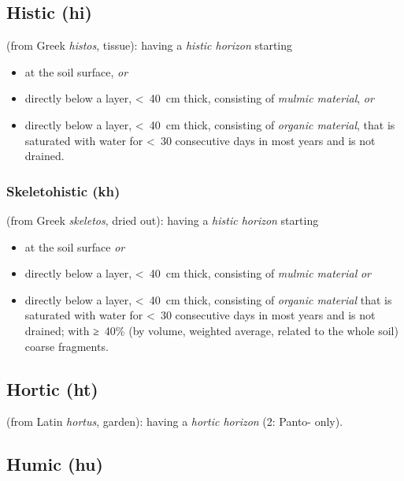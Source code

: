 \documentclass[
  letterpaper,
  DIV=11,
  numbers=noendperiod]{scrreprt}
\providecommand{\tightlist}{%
  \setlength{\itemsep}{0pt}\setlength{\parskip}{0pt}}\usepackage{longtable,booktabs,array}
\begin{document}
\hypertarget{histic-hi}{%
\subsection{Histic (hi)}\label{histic-hi}}

(from Greek \emph{histos}, tissue): having a \emph{histic horizon}
starting

\begin{itemize}
\tightlist
\item
  at the soil surface, \emph{or}
\item
  directly below a layer, \textless~40~cm thick, consisting of
  \emph{mulmic material}, \emph{or}
\item
  directly below a layer, \textless~40~cm thick, consisting of
  \emph{organic material}, that is saturated with water for \textless~30
  consecutive days in most years and is not drained.
\end{itemize}

\hypertarget{skeletohistic-kh}{%
\subsubsection{Skeletohistic (kh)}\label{skeletohistic-kh}}

(from Greek \emph{skeletos}, dried out): having a \emph{histic horizon}
starting

\begin{itemize}
\tightlist
\item
  at the soil surface \emph{or}
\item
  directly below a layer, \textless~40~cm thick, consisting of
  \emph{mulmic material} \emph{or}
\item
  directly below a layer, \textless~40~cm thick, consisting of
  \emph{organic material} that is saturated with water for \textless~30
  consecutive days in most years and is not drained; with ≥~40\% (by
  volume, weighted average, related to the whole soil) coarse fragments.
\end{itemize}

\hypertarget{hortic-ht}{%
\subsection{Hortic (ht)}\label{hortic-ht}}

(from Latin \emph{hortus}, garden): having a \emph{hortic horizon} (2:
Panto- only).

\hypertarget{humic-hu}{%
\subsection{Humic (hu)}\label{humic-hu}}
\end{document}
